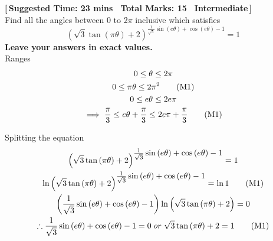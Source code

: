 \textbf{\hypertarget{P4}{[\,Suggested Time: 23 mins \textbar \, Total Marks: 15 \textbar \, Intermediate\,]}}\\
    Find all the angles between 0 to 2\(\pi\) inclusive which satisfies
    \begin{equation*}
    \displaystyle \left(\sqrt{3}\tan{(\pi\theta)}+2\right)^{\textstyle\frac{1}{\sqrt{3}}\sin{(e\theta)}+\cos{(e\theta)}-1}=1
    \end{equation*}
    \textbf{Leave your answers in exact values.} \\



Ranges
\begin{gather*}
    0\le\theta\le2\pi \nonumber\\
    0\le\pi\theta\le2\pi^{2} \wrkonemark \\
    0\le e\theta\le2e\pi \nonumber\\
    \implies\frac{\pi}{3}\le e\theta+\frac{\pi}{3}\le2e\pi+\frac{\pi}{3} \wrkonemark \\
\end{gather*}

Splitting the equation
\begin{gather*}
    \displaystyle \left(\sqrt{3}\tan{(\pi\theta)}+2\right)^{\textstyle \frac{1}{\sqrt{3}}\sin{(e\theta)}+\cos{(e\theta)}-1} = 1\\
    \displaystyle \ln\left(\sqrt{3}\tan{(\pi\theta)}+2\right)^{\textstyle \frac{1}{\sqrt{3}}\sin{(e\theta)}+\cos{(e\theta)}-1} = \ln 1 \wrkonemark \\
    \displaystyle \left(\frac{1}{\sqrt{3}}\sin{(e\theta)}+\cos{(e\theta)}-1\right)\ln\left(\sqrt{3}\tan{(\pi \theta)}+2\right) = 0\\
    \therefore
    \displaystyle\frac{1}{\sqrt{3}}\sin{(e\theta)}+\cos{(e\theta)}-1=0 %
    \; or \;
    \sqrt{3}\tan{(\pi \theta)}+2 = 1 \wrkonemark \\ %
\end{gather*}

